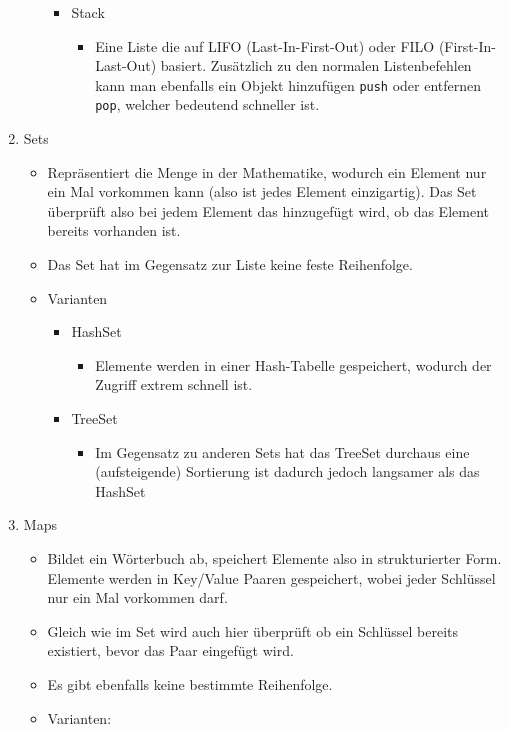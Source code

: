 \documentclass{article}
\begin{document}
\begin{enumerate}
\begin{itemize}
\begin{itemize}
				\item{Stack}
				\begin{itemize}
					\item{Eine Liste die auf LIFO (Last-In-First-Out) oder FILO (First-In-Last-Out) basiert. Zusätzlich zu den normalen Listenbefehlen kann man ebenfalls ein Objekt hinzufügen \verb|push|  oder entfernen \verb|pop|, welcher bedeutend schneller ist.}
				\end{itemize}
			\end{itemize}
		\end{itemize}
		\item{Sets}
		\begin{itemize}
			\item{Repräsentiert die Menge in der Mathematike, wodurch ein Element nur ein Mal vorkommen kann (also ist jedes Element einzigartig). Das Set überprüft also bei jedem Element das hinzugefügt wird, ob das Element bereits vorhanden ist.}
			\item{Das Set hat im Gegensatz zur Liste keine feste Reihenfolge.}
			\item{Varianten}
			\begin{itemize}
				\item{HashSet}
				\begin{itemize}
					\item{Elemente werden in einer Hash-Tabelle gespeichert, wodurch der Zugriff extrem schnell ist.}
				\end{itemize}
				\item{TreeSet}
				\begin{itemize}
					\item{Im Gegensatz zu anderen Sets hat das TreeSet durchaus eine (aufsteigende) Sortierung ist dadurch jedoch langsamer als das HashSet}
				\end{itemize}
			\end{itemize}
		\end{itemize}
		\item{Maps}
		\begin{itemize}
			\item{Bildet ein Wörterbuch ab, speichert Elemente also in strukturierter Form. Elemente werden in Key/Value Paaren gespeichert, wobei jeder Schlüssel nur ein Mal vorkommen darf.}
			\item{Gleich wie im Set wird auch hier überprüft ob ein Schlüssel bereits existiert, bevor das Paar eingefügt wird.}
			\item{Es gibt ebenfalls keine bestimmte Reihenfolge.}
			\item{Varianten:}

\end{itemize}
\end{enumerate}
\end{document}
